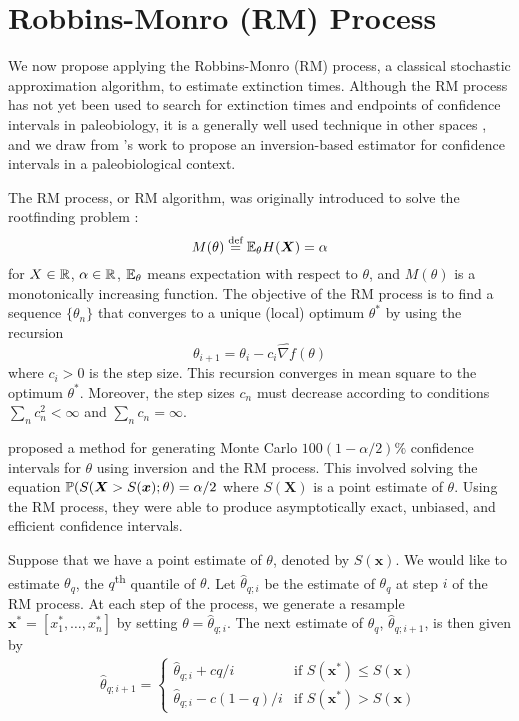 \section{Robbins-Monro (RM) Process}

We now propose applying the Robbins-Monro (RM) process, a classical stochastic approximation algorithm, to estimate extinction times. Although the RM process has not yet been used to search for extinction times and endpoints of confidence intervals in paleobiology, it is a generally well used technique in other spaces \parencite{Carpenter1999, Fisher2020}, and we draw from \textcite{Garthwaite1992}'s work to propose an inversion-based estimator for confidence intervals in a paleobiological context.

The RM process, or RM algorithm, was originally introduced to solve the rootfinding problem  \parencite{Fu2015}: \[ M(\theta)\overset{\text{def}}{=} \mathbb{E}_\theta H(\bm{X}) = \alpha \] for $X \in \mathbb{R}$, $\alpha \in \mathbb{R}$, $\mathbb{E}_\theta$ means expectation with respect to $\theta$, and $M(\theta)$ is a monotonically increasing function. The objective of the RM process is to find a sequence $\{\theta_n\}$ that converges to a unique (local) optimum $\theta^*$ by using the recursion \[ \theta_{i+1} = \theta_i - c_i \widehat{\nabla f}(\theta) \] where $c_i > 0$ is the step size. This recursion converges in mean square to the optimum $\theta^*$. Moreover, the step sizes $c_n$ must decrease according to conditions $\sum_nc_n^2 < \infty$ and $\sum_n c_n = \infty$.

\textcite{Garthwaite1992} proposed a method for generating Monte Carlo $100(1-\alpha/2)\%$ confidence intervals for $\theta$ using inversion and the RM process. This involved solving the equation $\mathbb{P}(S(\bm{X} > S(\bm{x}); \theta) = \alpha/2$ where $S(\bm{X})$ is a point estimate of $\theta$. Using the RM process, they were able to produce asymptotically exact, unbiased, and efficient confidence intervals.

Suppose that we have a point estimate of $\theta$, denoted by $S(\bm{x})$. We would like to estimate $\theta_{q}$, the $q$\textsuperscript{th} quantile of $\theta$. Let $\hat\theta_{q; i}$ be the estimate of $\theta_q$ at step $i$ of the RM process. At each step of the process, we generate a resample $\bm{x}^* = [x_1^*, \dots, x_n^*]$ by setting $\theta = \hat\theta_{q; i}$. The next estimate of $\theta_q$, $\hat\theta_{q; i+1}$, is then given by \begin{align}
    \hat\theta_{q; i+1} = \begin{cases}
        \hat\theta_{q; i} + c q/i &\text{if $S(\bm{x^*}) \leq S(\bm{x})$} \\
        \hat\theta_{q; i} - c (1-q)/i &\text{if $S(\bm{x^*}) > S(\bm{x})$}
    \end{cases}
\end{align}

